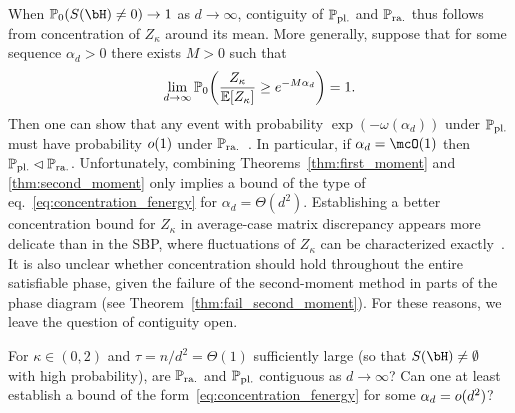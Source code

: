 When $\bbP_0(S(\bH) \neq 0) \to 1$ as $d \to \infty$, contiguity of $\mathbb{P}_{\mathrm{pl.}}$ and $\mathbb{P}_{\mathrm{ra.}}$ thus follows from concentration of $Z_\kappa$ around its mean. 
More generally, suppose that for some sequence $\alpha_d > 0$ there exists $M > 0$ such that
\begin{align}\label{eq:concentration_fenergy}
    \lim_{d \to \infty}\mathbb{P}_0\!\left(\frac{Z_\kappa}{\mathbb{E}[Z_\kappa]} \geq e^{-M\alpha_d}\right) = 1.
\end{align}
Then one can show that any event with probability $\exp(-\omega(\alpha_d))$ under $\mathbb{P}_{\mathrm{pl.}}$ must have probability $o(1)$ under $\mathbb{P}_{\mathrm{ra.}}$~\citep{perkins2021frozen}.
In particular, if $\alpha_d = \mcO(1)$ then $\mathbb{P}_{\mathrm{pl.}} \lhd \mathbb{P}_{\mathrm{ra.}}$. 
Unfortunately, combining Theorems~\ref{thm:first_moment} and \ref{thm:second_moment} only implies a bound of the type of eq.~\eqref{eq:concentration_fenergy} 
for $\alpha_d = \Theta(d^2)$.
Establishing a better concentration bound for $Z_\kappa$ in average-case matrix discrepancy appears more delicate than in the SBP, 
where fluctuations of $Z_\kappa$ can be characterized exactly~\citep{abbe2022proof}. 
It is also unclear whether concentration should hold throughout the entire satisfiable phase, given the failure of the second-moment method in parts of the phase diagram (see Theorem~\ref{thm:fail_second_moment}). 
For these reasons, we leave the question of contiguity open. 
\begin{openquestion}[Contiguity]\label{op:contiguity}
    For $\kappa \in (0,2)$ and $\tau = n/d^2 = \Theta(1)$ sufficiently large (so that $S(\bH) \neq \emptyset$ with high probability), are $\mathbb{P}_{\mathrm{ra.}}$ and $\mathbb{P}_{\mathrm{pl.}}$ contiguous as $d \to \infty$? 
    Can one at least establish a bound of the form~\eqref{eq:concentration_fenergy} for some $\alpha_d = o(d^2)$?
\end{openquestion}

